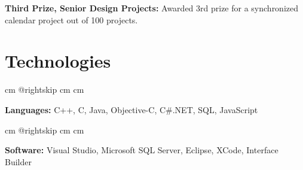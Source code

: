\documentclass[10pt, letterpaper]{article}
\begin{document}
        \textbf{Third Prize, Senior Design Projects:} Awarded 3rd prize for a synchronized calendar project out of 100 projects.
        \par\endgroup


    
    \section{Technologies}

        \begingroup{} cm
        \advance\csname @rightskip cm
        \advance{} cm

        \textbf{Languages:} C++, C, Java, Objective-C, C\#.NET, SQL, JavaScript
        \par\endgroup

        \vspace{0.2 cm}
        \begingroup{} cm
        \advance\csname @rightskip cm
        \advance{} cm

        \textbf{Software:} Visual Studio, Microsoft SQL Server, Eclipse, XCode, Interface Builder
        \par\endgroup


    
\end{document}
